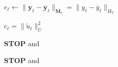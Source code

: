 \documentclass{article}
\numberwithin{equation}{section}
\begin{document}
\begin{algorithm}[ht]
{{		 $e_\ell \gets \|\mathbf{y}_\ell -{\overline{\mathbf y}}_\ell\|_{{\mathbf M}_\ell} =\|{y}_\ell -{\overline{y}}_\ell\|_{H_Y}$ 
		 
		 $c_\ell = \|\widetilde{u}_\ell\|_U^2$ 
        
         {
         {\bf STOP} and 
         }
        
         {
         {\bf STOP} and 
         }

    }
	
	
	\caption{Accuracy and cost controlled nested iteration.} 
	\label{Algorithm1}
}
\end{algorithm}
\end{document}
